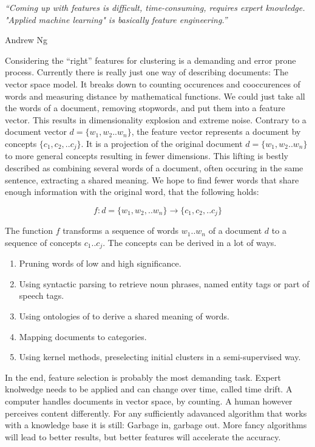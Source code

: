 \epigraph{\emph{
  ``Coming up with features is difficult, time-consuming, requires expert knowledge. "Applied machine learning" is basically feature engineering.''
}}{ Andrew Ng }

Considering the ``right'' features for clustering is a demanding and error prone process. Currently there is really just one way of describing documents: The vector space model. It breaks down to counting occurences and cooccurences of words and measuring distance by mathematical functions. We could just take all the words of a document, removing stopwords, and put them into a feature vector. This results in dimensionality explosion and extreme noise. Contrary to a document vector $d = \{w_1,w_2..w_n\}$, the feature vector represents a document by concepts $\{c_1,c_2,..c_j\}$. It is a projection of the original document $d = \{w_1,w_2..w_n\}$ to more general concepts resulting in fewer dimensions. This lifting is bestly described as combining several words of a document, often occuring in the same sentence, extracting a shared meaning. We hope to find fewer words that share enough information with the original word, that the following holds:
  
  \begin{equation}
    f : d=\{w_1,w_2,..w_n\} \to \{c_1,c_2,..c_j\}
  \end{equation}

The function $f$ transforms a sequence of words $w_1..w_n$ of a document $d$ to a sequence of concepts $c_1..c_j$. The concepts can be derived in a lot of ways.

  \begin{enumerate}
    \item Pruning words of low and high significance.
    \item Using syntactic parsing to retrieve noun phrases, named entity tags or part of speech tags.
    \item Using ontologies of \wordnet{} to derive a shared meaning of words.
    \item Mapping documents to \wiki{} categories.
    \item Using kernel methods, preselecting initial clusters in a semi-supervised way.
  \end{enumerate}

In the end, feature selection is probably the most demanding task. Expert knolwedge needs to be applied and can change over time, called time drift. A computer handles documents in vector space, by counting. A human however perceives content differently. For any sufficiently adavanced algorithm that works with a knowledge base it is still: Garbage in, garbage out. More fancy algorithms will lead to better results, but better features will accelerate the accuracy.\\

